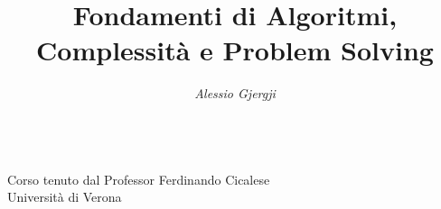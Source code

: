 \documentclass[oneside,a4paper,11pt]{book}
\title{Fondamenti di Algoritmi, Complessità e Problem Solving}
\author{\textit{Alessio Gjergji}}
\date{}
\theoremstyle{italicstyle}
\theoremstyle{normStyle}
\begin{document}
\begin{titlingpage}
  \centering
  \huge
  \textbf{\thetitle}\\[0.5cm]
  \normalsize
  Corso tenuto dal Professor Ferdinando Cicalese\\[0.5cm]
  Università di Verona\\[1cm]
  \large
  \theauthor\\[0.5cm]
\end{titlingpage}
\tableofcontents



\end{document}
